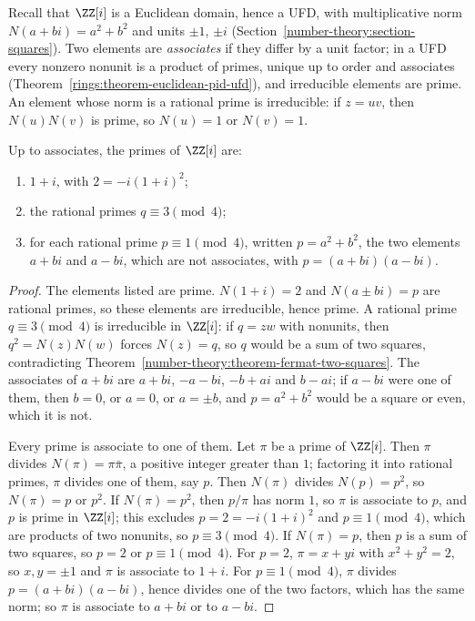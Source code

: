 Recall that $\ZZ[i]$ is a Euclidean domain, hence a UFD, with multiplicative norm $N(a + bi) = a^2 + b^2$ and units $\pm1$, $\pm i$ (Section~\ref{number-theory:section-squares}). Two elements are
\emph{associates} if they differ by a unit factor; in a UFD every nonzero nonunit is a product of primes, unique up to order and associates (Theorem~\ref{rings:theorem-euclidean-pid-ufd}), and
irreducible elements are prime. An element whose norm is a rational prime is irreducible: if $z = uv$, then $N(u)N(v)$ is prime, so $N(u) = 1$ or $N(v) = 1$.

\begin{theorem}\label{number-theory:theorem-gaussian-primes}
Up to associates, the primes of $\ZZ[i]$ are:
\begin{enumerate}
\item $1 + i$, with $2 = -i(1 + i)^2$;
\item the rational primes $q \equiv 3 \pmod 4$;
\item for each rational prime $p \equiv 1 \pmod 4$, written $p = a^2 + b^2$, the two elements $a + bi$ and $a - bi$, which are not associates, with $p = (a + bi)(a - bi)$.
\end{enumerate}
\end{theorem}

\begin{proof}
The elements listed are prime. $N(1 + i) = 2$ and $N(a \pm bi) = p$ are rational primes, so these elements are irreducible, hence prime. A rational prime $q \equiv 3 \pmod 4$ is irreducible in $\ZZ[i]$: if
$q = zw$ with nonunits, then $q^2 = N(z)N(w)$ forces $N(z) = q$, so $q$ would be a sum of two squares, contradicting Theorem~\ref{number-theory:theorem-fermat-two-squares}. The associates of $a + bi$ are
$a + bi$, $-a - bi$, $-b + ai$ and $b - ai$; if $a - bi$ were one of them, then $b = 0$, or $a = 0$, or $a = \pm b$, and $p = a^2 + b^2$ would be a square or even, which it is not.

Every prime is associate to one of them. Let $\pi$ be a prime of $\ZZ[i]$. Then $\pi$ divides $N(\pi) = \pi\bar\pi$, a positive integer greater than $1$; factoring it into rational primes, $\pi$ divides
one of them, say $p$. Then $N(\pi)$ divides $N(p) = p^2$, so $N(\pi) = p$ or $p^2$. If $N(\pi) = p^2$, then $p/\pi$ has norm $1$, so $\pi$ is associate to $p$, and $p$ is prime in $\ZZ[i]$; this excludes
$p = 2 = -i(1 + i)^2$ and $p \equiv 1 \pmod 4$, which are products of two nonunits, so $p \equiv 3 \pmod 4$. If $N(\pi) = p$, then $p$ is a sum of two squares, so $p = 2$ or $p \equiv 1 \pmod 4$. For
$p = 2$, $\pi = x + yi$ with $x^2 + y^2 = 2$, so $x, y = \pm1$ and $\pi$ is associate to $1 + i$. For $p \equiv 1 \pmod 4$, $\pi$ divides $p = (a + bi)(a - bi)$, hence divides one of the two factors, which
has the same norm; so $\pi$ is associate to $a + bi$ or to $a - bi$.
\end{proof}

